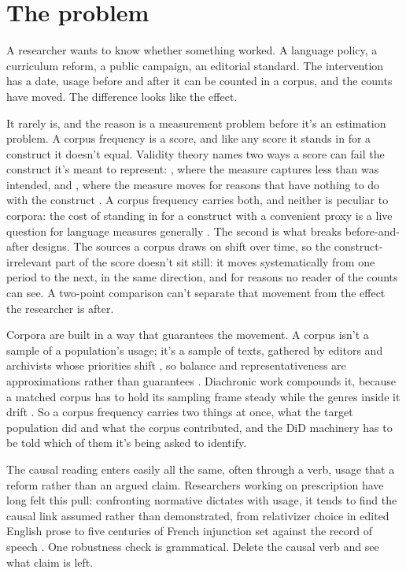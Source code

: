 \section{The problem}
\label{sec:problem}

A researcher wants to know whether something worked. A language policy, a curriculum reform, a public campaign, an editorial standard. The intervention has a date, usage before and after it can be counted in a corpus, and the counts have moved. The difference looks like the effect.

It rarely is, and the reason is a measurement problem before it's an estimation problem. A corpus frequency is a score, and like any score it stands in for a construct it doesn't equal. Validity theory names two ways a score can fail the construct it's meant to represent: , where the measure captures less than was intended, and , where the measure moves for reasons that have nothing to do with the construct \citep{messick_1989_validity,messick1995Validity}. A corpus frequency carries both, and neither is peculiar to corpora: the cost of standing in for a construct with a convenient proxy is a live question for language measures generally \citep{BotesEtAl2026}. The second is what breaks before-and-after designs. The sources a corpus draws on shift over time, so the construct-irrelevant part of the score doesn't sit still: it moves systematically from one period to the next, in the same direction, and for reasons no reader of the counts can see. A two-point comparison can't separate that movement from the effect the researcher is after.

Corpora are built in a way that guarantees the movement. A corpus isn't a sample of a population's usage; it's a sample of texts, gathered by editors and archivists whose priorities shift \citep{biber1993}, so balance and representativeness are approximations rather than guarantees \citep{McEneryHardie2012}. Diachronic work compounds it, because a matched corpus has to hold its sampling frame steady while the genres inside it drift \citep{LeechHundtMairSmith2009}. So a corpus frequency carries two things at once, what the target population did and what the corpus contributed, and the DiD machinery has to be told which of them it's being asked to identify.

The causal reading enters easily all the same, often through a verb, usage that  a reform rather than an argued claim. Researchers working on prescription have long felt this pull: confronting normative dictates with usage, it tends to find the causal link assumed rather than demonstrated, from relativizer choice in edited English prose \citep{HinrichsSzmrecsanyiBohmann2015} to five centuries of French injunction set against the record of speech \citep{PoplackDion2009}. One robustness check is grammatical. Delete the causal verb and see what claim is left.

